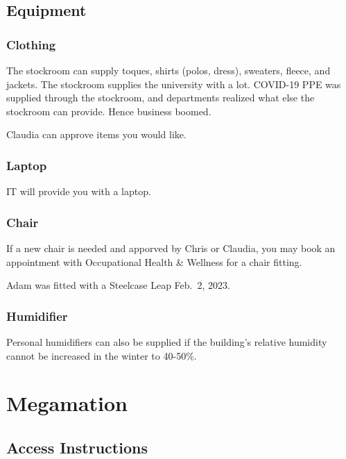 \documentclass[
  letterpaper,
  DIV=11,
  numbers=noendperiod,
  oneside]{scrreprt}
\begin{document}
\hypertarget{equipment}{%
\section{Equipment}\label{equipment}}

\hypertarget{clothing}{%
\subsection{Clothing}\label{clothing}}

The stockroom can supply toques, shirts (polos, dress), sweaters,
fleece, and jackets. The stockroom supplies the university with a lot.
COVID-19 PPE was supplied through the stockroom, and departments
realized what else the stockroom can provide. Hence business boomed.

Claudia can approve items you would like.

\hypertarget{laptop}{%
\subsection{Laptop}\label{laptop}}

IT will provide you with a laptop.

\hypertarget{chair}{%
\subsection{Chair}\label{chair}}

If a new chair is needed and apporved by Chris or Claudia, you may book
an appointment with Occupational Health \& Wellness for a chair fitting.

Adam was fitted with a Steelcase Leap Feb.~2, 2023.

\hypertarget{humidifier}{%
\subsection{Humidifier}\label{humidifier}}

Personal humidifiers can also be supplied if the building's relative
humidity cannot be increased in the winter to 40-50\%.


\hypertarget{sec-megamation}{%
\chapter{Megamation}\label{sec-megamation}}

\hypertarget{access-instructions}{%
\section{Access Instructions}\label{access-instructions}}
\end{document}

